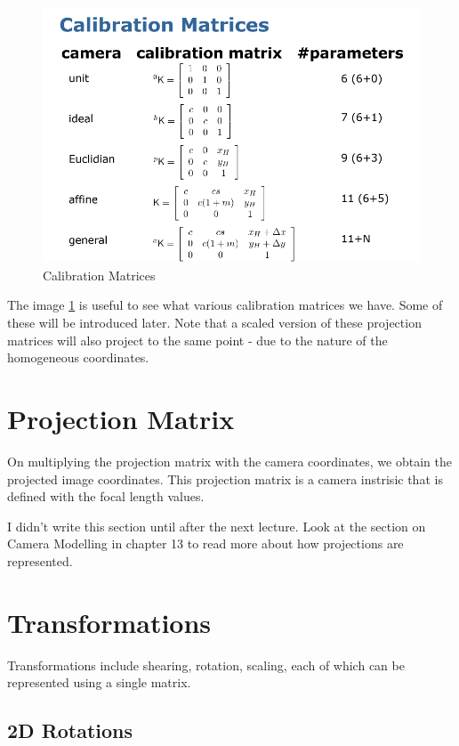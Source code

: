 \begin{figure}[h]
    \centering
    \includegraphics[width=12cm]{img/calibration-matrices.png}
    \caption{Calibration Matrices}
    \label{fig:calibration}
\end{figure}

The image \ref{fig:calibration} is useful to see what various calibration matrices we have. Some of these will be introduced later. Note that a scaled version of these projection matrices will also project to the same point - due to the nature of the homogeneous coordinates.

\section{Projection Matrix}

On multiplying the projection matrix with the camera coordinates, we obtain the projected image coordinates. This projection matrix is a camera instrisic that is defined with the focal length values. 

I didn't write this section until after the next lecture. Look at the section on Camera Modelling in chapter 13 to read more about how projections are represented.

\section{Transformations}

Transformations include shearing, rotation, scaling, each of which can be represented using a single matrix.

\subsection{2D Rotations}

